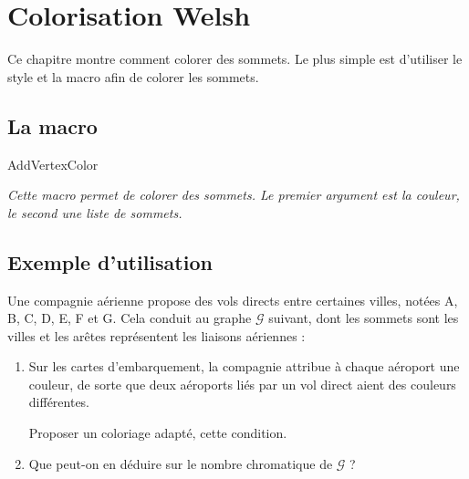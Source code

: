 \section{Colorisation Welsh} 
Ce chapitre montre comment colorer des sommets. Le plus simple est d'utiliser le style  et la macro  afin de colorer les sommets.

\subsection{La macro  } 

\begin{NewMacroBox}{AddVertexColor}{}

\medskip
\emph{Cette macro permet de colorer des sommets. Le premier argument est la couleur, le second une liste  de sommets.}
\end{NewMacroBox} 

\subsection{Exemple d'utilisation } 

\medskip
Une compagnie aérienne propose des vols directs entre certaines villes, notées A, B, C, D, E, F et G. Cela conduit au graphe $\mathcal{G}$ suivant, dont les sommets sont les villes et les arêtes représentent les liaisons aériennes :
 
 \begin{center}
\end{center}

\begin{enumerate}

\item Sur les cartes d'embarquement, la compagnie attribue à chaque aéroport une couleur, de sorte que deux aéroports liés par un vol direct aient des couleurs différentes.

 Proposer un coloriage adapté‚ cette condition.
\item Que peut-on en déduire sur le nombre chromatique de $\mathcal{G}$ ?
\end{enumerate}



